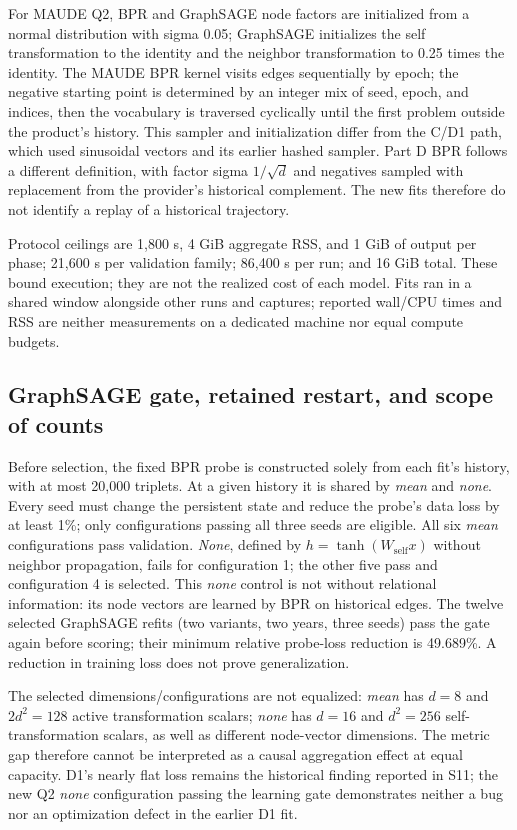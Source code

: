 For MAUDE Q2, BPR and GraphSAGE node factors are initialized from a normal distribution with sigma 0.05; GraphSAGE initializes the self transformation to the identity and the neighbor transformation to 0.25 times the identity. The MAUDE BPR kernel visits edges sequentially by epoch; the negative starting point is determined by an integer mix of seed, epoch, and indices, then the vocabulary is traversed cyclically until the first problem outside the product's history. This sampler and initialization differ from the C/D1 path, which used sinusoidal vectors and its earlier hashed sampler. Part D BPR follows a different definition, with factor sigma $1/\sqrt{d}$ and negatives sampled with replacement from the provider's historical complement. The new fits therefore do not identify a replay of a historical trajectory.

Protocol ceilings are 1,800 s, 4 GiB aggregate RSS, and 1 GiB of output per phase; 21,600 s per validation family; 86,400 s per run; and 16 GiB total. These bound execution; they are not the realized cost of each model. Fits ran in a shared window alongside other runs and captures; reported wall/CPU times and RSS are neither measurements on a dedicated machine nor equal compute budgets.

\subsection{GraphSAGE gate, retained restart, and scope of counts}

Before selection, the fixed BPR probe is constructed solely from each fit's history, with at most 20,000 triplets. At a given history it is shared by \emph{mean} and \emph{none}. Every seed must change the persistent state and reduce the probe's data loss by at least 1\%; only configurations passing all three seeds are eligible. All six \emph{mean} configurations pass validation. \emph{None}, defined by $h=\tanh(W_{\mathrm{self}}x)$ without neighbor propagation, fails for configuration 1; the other five pass and configuration 4 is selected. This \emph{none} control is not without relational information: its node vectors are learned by BPR on historical edges. The twelve selected GraphSAGE refits (two variants, two years, three seeds) pass the gate again before scoring; their minimum relative probe-loss reduction is 49.689\%. A reduction in training loss does not prove generalization.

The selected dimensions/configurations are not equalized: \emph{mean} has $d=8$ and $2d^2=128$ active transformation scalars; \emph{none} has $d=16$ and $d^2=256$ self-transformation scalars, as well as different node-vector dimensions. The metric gap therefore cannot be interpreted as a causal aggregation effect at equal capacity. D1's nearly flat loss remains the historical finding reported in S11; the new Q2 \emph{none} configuration passing the learning gate demonstrates neither a bug nor an optimization defect in the earlier D1 fit.

